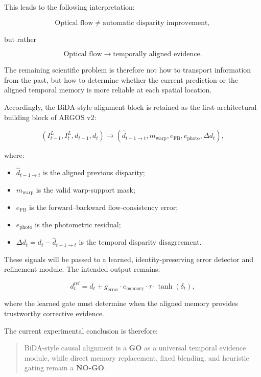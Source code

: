 \documentclass[11pt,a4paper]{article}
\begin{document}
This leads to the following interpretation:

\[
\text{Optical flow}
\neq
\text{automatic disparity improvement},
\]

but rather

\[
\text{Optical flow}
\rightarrow
\text{temporally aligned evidence}.
\]

The remaining scientific problem is therefore not how to transport information from the past, but how to determine whether the current prediction or the aligned temporal memory is more reliable at each spatial location.

Accordingly, the BiDA-style alignment block is retained as the first architectural building block of ARGOS v2:

\[
\left(
I_{t-1}^{L},
I_t^{L},
d_{t-1},
d_t
\right)
\rightarrow
\left(
\hat{d}_{t-1 \rightarrow t},
m_{\mathrm{warp}},
e_{\mathrm{FB}},
e_{\mathrm{photo}},
\Delta d_t
\right),
\]

where:

\begin{itemize}
    \item $\hat{d}_{t-1 \rightarrow t}$ is the aligned previous disparity;
    \item $m_{\mathrm{warp}}$ is the valid warp-support mask;
    \item $e_{\mathrm{FB}}$ is the forward--backward flow-consistency error;
    \item $e_{\mathrm{photo}}$ is the photometric residual;
    \item $\Delta d_t = d_t - \hat{d}_{t-1 \rightarrow t}$ is the temporal disparity disagreement.
\end{itemize}

These signals will be passed to a learned, identity-preserving error detector and refinement module. The intended output remains:

\[
d_t^{\mathrm{ref}}
=
d_t
+
g_{\mathrm{error}}
\cdot
c_{\mathrm{memory}}
\cdot
\tau
\cdot
\tanh(\delta_t),
\]

where the learned gate must determine when the aligned memory provides trustworthy corrective evidence.

The current experimental conclusion is therefore:

\begin{quote}
BiDA-style causal alignment is a \textbf{GO} as a universal temporal evidence module, while direct memory replacement, fixed blending, and heuristic gating remain a \textbf{NO-GO}.
\end{quote}
\end{document}
